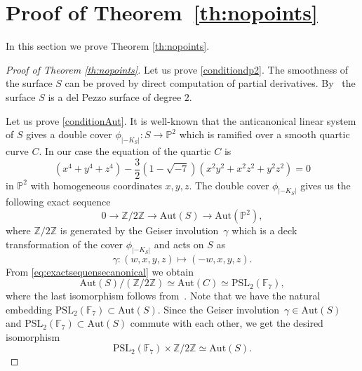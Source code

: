 \documentclass{amsart}
\numberwithin{equation}{section}
\theoremstyle{definition}
\begin{document}
\section{Proof of Theorem~\ref{th:nopoints}}

In this section we prove Theorem \ref{th:nopoints}.

\begin{proof}[Proof of Theorem \ref{th:nopoints}]
Let us prove \ref{conditiondp2}. The smoothness of the surface $S$ can be proved by direct computation of partial derivatives. By~\cite[Proposition 6.3.6]{Dolgachev} the surface $S$ is a del Pezzo surface of degree $2.$



Let us prove \ref{conditionAut}. It is well-known that the anticanonical linear system of $S$ gives a double cover $\phi_{|-K_S|}:S \to \mathbb{P}^2$ which is ramified over a smooth quartic curve $C$. In our case the equation of the quartic $C$ is 
\begin{equation}\label{eq:quarticcurve}
(x^4+y^4+z^4)-\frac{3}{2}(1-\sqrt{-7})(x^2y^2+x^2z^2+y^2z^2)=0
\end{equation}
\noindent in $\mathbb{P}^2$ with homogeneous coordinates $x,y,z.$  The double cover $\phi_{|-K_S|}$ gives us the following exact sequence
\begin{equation}\label{eq:exactsequensecanonical}
0 \to \mathbb{Z}/2\mathbb{Z} \to \mathrm{Aut}(S) \to \mathrm{Aut}(\mathbb{P}^2),
\end{equation}
\noindent where $\mathbb{Z}/2\mathbb{Z}$ is generated by the Geiser involution~$\gamma$ which is a deck transformation of the cover  $\phi_{|-K_S|}$ and  acts on $S$ as 
$$
\gamma:(w,x,y,z) \mapsto (-w,x,y,z).
$$
\noindent From \eqref{eq:exactsequensecanonical} we obtain
\begin{equation}\label{eq:aut}
\mathrm{Aut}(S)/\left(\mathbb{Z}/2\mathbb{Z}\right) \simeq \mathrm{Aut}(C) \simeq \mathrm{PSL}_2(\mathbb{F}_7),
\end{equation}
\noindent where the last isomorphism follows  from~\cite[Chapter 1]{Elkies}. Note that we have the natural embedding $\mathrm{PSL}_2(\mathbb{F}_7) \subset \mathrm{Aut}(S).$  Since  the Geiser involution~\mbox{$\gamma \in \mathrm{Aut}(S)$} and $\mathrm{PSL}_2(\mathbb{F}_7) \subset \mathrm{Aut}(S)$ commute with each other, we get the desired isomorphism
$$
\mathrm{PSL}_2(\mathbb{F}_7) \times \mathbb{Z}/2\mathbb{Z} \simeq \mathrm{Aut}(S).
$$















\end{proof}
\end{document}
